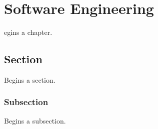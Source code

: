 \let\textcircled=\pgftextcircled
\chapter{Software Engineering}
\label{chap:software-engineering}

egins a chapter. 
\section{Section}
\label{sec:sec01}

Begins a section.

\subsection{Subsection}
\label{subsec:subsec01}

Begins a subsection.
